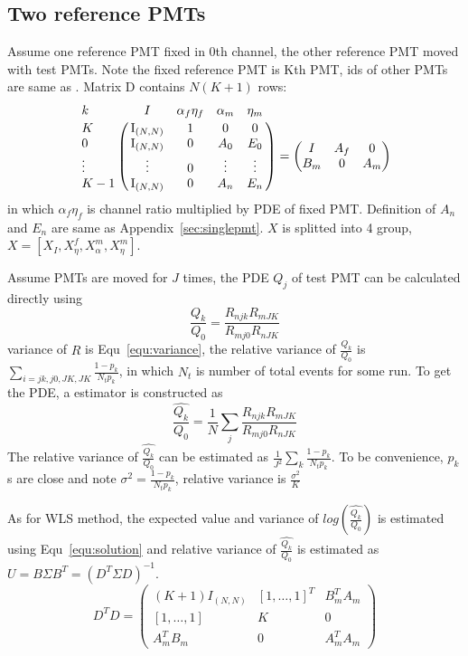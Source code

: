 \subsection{Two reference PMTs}
Assume one reference PMT fixed in 0th channel, the other reference PMT moved with test PMTs. Note the fixed reference PMT is Kth PMT, ids of other PMTs are same as . Matrix D contains $N(K+1)$ rows:
\begin{equation}
    \bordermatrix{
        k&I&\alpha_f\eta_f&\alpha_m&\eta_m\cr
        K&\mathrm{I}_{(N,N)}&1&0&0\cr
        0&\mathrm{I}_{(N,N)}&0&A_{0}&E_{0}\cr
        \vdots&\vdots&0&\vdots&\vdots\cr
        K-1&\mathrm{I}_{(N,N)}&0&A_{n}&E_{n}
    }=\begin{pmatrix}
        I&A_f&0\\
        B_m&0&A_m
    \end{pmatrix}
\end{equation}
in which $\alpha_f\eta_f$ is channel ratio multiplied by PDE of fixed PMT. Definition of $A_n$ and $E_n$ are same as Appendix~\ref{sec:singlepmt}. $X$ is splitted into 4 group, $X=[X_I,X^f_\eta,X^m_\alpha,X^m_\eta]$.

Assume PMTs are moved for $J$ times, the PDE $Q_j$ of test PMT can be calculated directly using
\begin{equation}
    \frac{Q_k}{Q_0} = \frac{R_{njk}R_{mJK}}{R_{mj0}R_{nJK}}
\end{equation}
variance of $R$ is Equ~\eqref{equ:variance}, the relative variance of $\frac{Q_k}{Q_0}$ is $\sum_{i=jk,j0,JK,JK}{\frac{1-p_k}{N_tp_k}}$, in which $N_t$ is number of total events for some run. To get the PDE, a estimator is constructed as 
\begin{equation}
    \hat{\frac{Q_k}{Q_0}}=\frac{1}{N}\sum_j{\frac{R_{njk}R_{mJK}}{R_{mj0}R_{nJK}}}
\end{equation}
The relative variance of $\hat{\frac{Q_k}{Q_0}}$ can be estimated as $\frac{1}{J^2}\sum_k{\frac{1-p_k}{N_tp_k}}$. To be convenience, $p_k$s are close and note $\sigma^2=\frac{1-p_k}{N_tp_k}$, relative variance is $\frac{\sigma^2}{K}$

As for WLS method, the expected value and variance of $log(\hat{\frac{Q_k}{Q_0}})$ is estimated using Equ~\eqref{equ:solution} and relative variance of $\hat{\frac{Q_k}{Q_0}}$ is estimated as $U=B\Sigma B^T=(D^T\Sigma D)^{-1}$.
\begin{equation}
    D^TD=\begin{pmatrix}
        (K+1)I_{(N,N)} &[1,\dots,1]^T&B_m^TA_m\\
        [1,\dots,1]&K&0\\
        A_m^TB_m&0&A_m^TA_m
    \end{pmatrix}
\end{equation}

